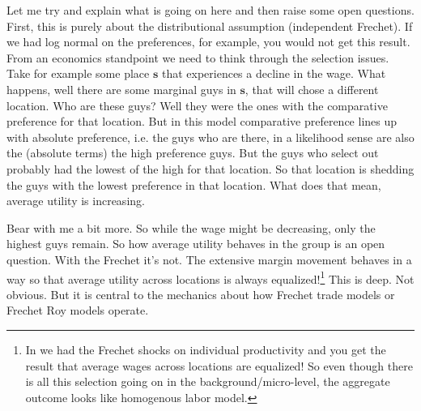 \documentclass[pdftex,12pt]{article}
\begin{document}
\medskip
\noindent Let me try and explain what is going on here and then raise some open questions. First, this is purely about the distributional assumption (independent Frechet). If we had log normal on the preferences, for example, you would not get this result. From an economics standpoint we need to think through the selection issues. Take for example some place $\textbf{s}$ that experiences a decline in the wage. What happens, well there are some marginal guys in $\textbf{s}$, that will chose a different location. Who are these guys? Well they were the ones with the comparative preference for that location. But in this model comparative preference lines up with absolute preference, i.e. the guys who are there, in a likelihood sense are also the (absolute terms) the high preference guys. But the guys who select out probably had the lowest of the high for that location. So that location is shedding the guys with the lowest preference in that location. What does that mean, average utility is increasing.

\medskip
\noindent Bear with me a bit more. So while the wage might be decreasing, only the highest guys remain. So how average utility behaves in the group is an open question. With the Frechet it's not. The extensive margin movement behaves in a way so that average utility across locations is always equalized!\footnote{In \citet{lagakos2013selection} we had the Frechet shocks on individual productivity and you get the result that average wages across locations are equalized! So even though there is all this selection going on in the background/micro-level, the aggregate outcome looks like homogenous labor model.} This is deep. Not obvious. But it is central to the mechanics about how Frechet trade models or Frechet Roy models operate.
\end{document}
